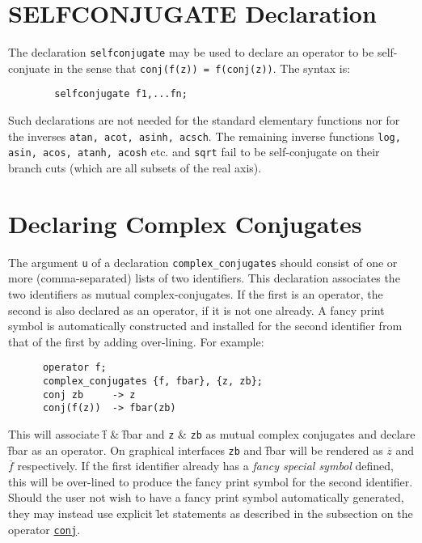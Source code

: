 \section{SELFCONJUGATE Declaration}
\hypertarget{command:SELFCONJUGATE}{}

The declaration \texttt{selfconjugate}
may be used 
to declare an operator to be self-conjuate in the sense that
\texttt{conj(f(z)) = f(conj(z))}. The syntax is:
\begin{verbatim}
        selfconjugate f1,...fn;
\end{verbatim}

Such declarations are not needed for the standard elementary functions nor
for the inverses \texttt{atan, acot, asinh, acsch}. The remaining inverse
functions \texttt{log, asin, acos, atanh, acosh} etc. and
\texttt{sqrt} fail to be self-conjugate on their branch cuts (which are all
subsets of the real axis).

\section{Declaring Complex Conjugates}

\hypertarget{command:COMPLEX_CONJUGATES}{}
The argument \texttt{u} of a declaration \texttt{complex\_conjugates}%
 should
consist of one or more (comma-separated) lists of two identifiers.
This declaration associates the two identifiers as
mutual complex-conjugates. If the first is an operator, the second is
also declared as an operator, if it is not one already. A fancy print symbol 
is automatically constructed and installed for the second identifier
from that of the first by adding over-lining. For example:
\begin{verbatim} 
      operator f;
      complex_conjugates {f, fbar}, {z, zb};
      conj zb     -> z
      conj(f(z))  -> fbar(zb)  
\end{verbatim}
This will associate \f{f} \& \f{fbar} and \texttt{z} \& \texttt{zb}
as mutual complex conjugates and declare \f{fbar} as an operator.
On graphical interfaces \texttt{zb} and \f{fbar} will be rendered as
$\overline{z}$ and $\overline{f}$ respectively. If the first identifier
already has a \emph{fancy special symbol} defined, this will be over-lined
to produce the fancy print symbol for the second identifier.
Should the user not wish to have a fancy print symbol automatically generated,
they may instead use explicit \f{let} statements as described in the 
subsection on the operator \hyperlink{operator:CONJ}{\texttt{conj}}.

